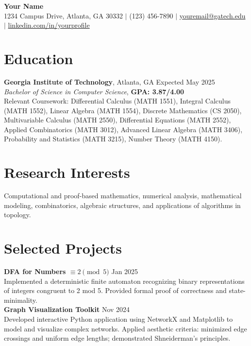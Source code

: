 \begin{center}
  {\LARGE\bfseries Your Name}\\
  \vspace{2pt}
  \small 1234 Campus Drive, Atlanta, GA 30332 $\vert$ (123) 456-7890 $\vert$ \href{mailto:youremail@gatech.edu}{youremail@gatech.edu} $\vert$ \href{https://www.linkedin.com/in/yourprofile}{linkedin.com/in/yourprofile}
\end{center}

\section*{Education}
\noindent
\textbf{Georgia Institute of Technology}, Atlanta, GA \hfill Expected May 2025\\
\textit{Bachelor of Science in Computer Science}, \textbf{GPA: 3.87/4.00}\\
Relevant Coursework: Differential Calculus (MATH 1551), Integral Calculus (MATH 1552), Linear Algebra (MATH 1554), Discrete Mathematics (CS 2050), Multivariable Calculus (MATH 2550), Differential Equations (MATH 2552), Applied Combinatorics (MATH 3012), Advanced Linear Algebra (MATH 3406), Probability and Statistics (MATH 3215), Number Theory (MATH 4150).

\section*{Research Interests}
Computational and proof-based mathematics, numerical analysis, mathematical modeling, combinatorics, algebraic structures, and applications of algorithms in topology.

\section*{Selected Projects}
\noindent
\textbf{DFA for Numbers $\equiv 2 \pmod{5}$} \hfill Jan 2025\\
Implemented a deterministic finite automaton recognizing binary representations of integers congruent to 2 mod 5. Provided formal proof of correctness and state-minimality.\\

\noindent
\textbf{Graph Visualization Toolkit} \hfill Nov 2024\\
Developed interactive Python application using NetworkX and Matplotlib to model and visualize complex networks. Applied aesthetic criteria: minimized edge crossings and uniform edge lengths; demonstrated Shneiderman's principles.\\

